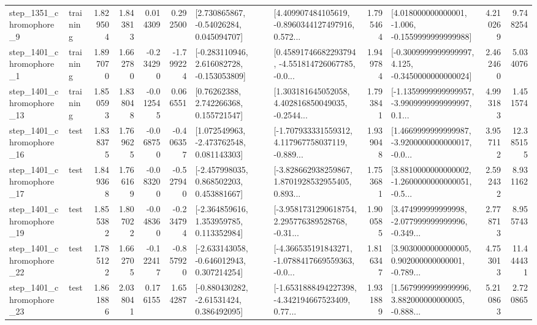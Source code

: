 \begin{tabular}{llrrrrllrlrr}
  step\_1351\_chromophore\_9 &  training &      1.829504 &    1.843813 &      0.014309 &  0.292500 &     [2.730865867, -0.54026284, 0.045094707] &  [4.409907484105619, -0.8960344127497916, 0.572... &       1.795464 &   [4.018000000000001, -1.006, -0.1559999999999988] &            4.210269 &          9.748254 \\
  step\_1401\_chromophore\_1 &  training &      1.897070 &    1.662780 &     -0.234290 & -1.799224 &   [-0.283110946, 2.616082728, -0.153053809] &  [0.45891746682293794, -4.551814726067785, -0.0... &       1.949784 &  [-0.3009999999999997, 4.125, -0.3450000000000024] &            2.462460 &          5.034076 \\
 step\_1401\_chromophore\_13 &  training &      1.850593 &    1.838048 &     -0.012545 &  0.066551 &      [0.76262388, 2.742266368, 0.155721547] &  [1.303181645052058, 4.402816850049035, -0.2544... &       1.793841 &  [-1.1359999999999957, -3.9909999999999997, 0.1... &            4.993183 &          1.451574 \\
 step\_1401\_chromophore\_16 &      test &      1.838375 &    1.769625 &     -0.068750 & -0.406357 &    [1.072549963, -2.473762548, 0.081143303] &  [-1.707933331559312, 4.117967758037119, -0.889... &       1.939048 &  [1.4669999999999987, -3.9200000000000017, -0.0... &            3.957112 &         12.385155 \\
 step\_1401\_chromophore\_17 &      test &      1.849368 &    1.766169 &     -0.083200 & -0.527940 &    [-2.457998035, 0.868502203, 0.453881667] &  [-3.828662938259867, 1.8701928532955405, 0.893... &       1.753681 &  [3.8810000000000002, -1.2600000000000051, -0.5... &            2.592432 &          8.931162 \\
 step\_1401\_chromophore\_19 &      test &      1.855382 &    1.807022 &     -0.048360 & -0.234794 &    [-2.364859616, 1.353959785, 0.113352984] &  [-3.9581731290618754, 2.295776389528768, -0.31... &       1.900585 &  [3.474999999999998, -2.077999999999996, -0.349... &            2.778713 &          8.955743 \\
 step\_1401\_chromophore\_22 &      test &      1.785122 &    1.662705 &     -0.122417 & -0.857920 &   [-2.633143058, -0.646012943, 0.307214254] &  [-4.366535191843271, -1.0788417669559363, -0.0... &       1.816347 &  [3.9030000000000005, 0.902000000000001, -0.789... &            4.753013 &         11.444431 \\
 step\_1401\_chromophore\_23 &      test &      1.861886 &    2.038041 &      0.176155 &  1.654287 &    [-0.880430282, -2.61531424, 0.386492095] &  [-1.6531888494227398, -4.342194667523409, 0.77... &       1.931889 &  [1.5679999999999996, 3.882000000000005, -0.888... &            5.210863 &          2.720865 \\

\end{tabular}
